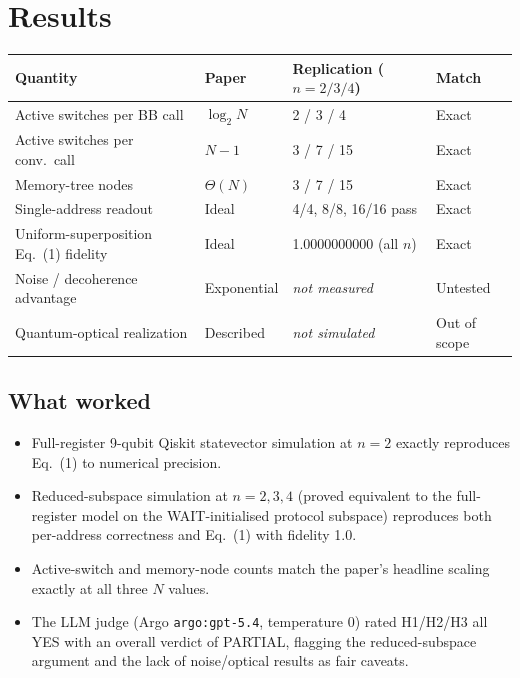 \documentclass[11pt]{article}
\begin{document}
\section{Results}
\begin{longtable}{@{}llll@{}}
\toprule
Quantity & Paper & Replication ($n{=}2/3/4$) & Match \\ \midrule
\endhead
Active switches per BB call & $\log_2 N$ & 2 / 3 / 4 & Exact \\
Active switches per conv.\ call & $N-1$ & 3 / 7 / 15 & Exact \\
Memory-tree nodes & $\Theta(N)$ & 3 / 7 / 15 & Exact \\
Single-address readout & Ideal & 4/4, 8/8, 16/16 pass & Exact \\
Uniform-superposition Eq.~(1) fidelity & Ideal & 1.0000000000 (all $n$) & Exact \\
Noise / decoherence advantage & Exponential & \textit{not measured} & Untested \\
Quantum-optical realization & Described & \textit{not simulated} & Out of scope \\
\bottomrule
\end{longtable}

\subsection{What worked}
\begin{itemize}
  \item Full-register 9-qubit Qiskit statevector simulation at $n{=}2$ exactly
    reproduces Eq.~(1) to numerical precision.
  \item Reduced-subspace simulation at $n{=}2,3,4$ (proved equivalent to the
    full-register model on the WAIT-initialised protocol subspace) reproduces
    both per-address correctness and Eq.~(1) with fidelity 1.0.
  \item Active-switch and memory-node counts match the paper's headline
    scaling exactly at all three $N$ values.
  \item The LLM judge (Argo \texttt{argo:gpt-5.4}, temperature 0) rated
    H1/H2/H3 all YES with an overall verdict of PARTIAL, flagging the
    reduced-subspace argument and the lack of noise/optical results as fair
    caveats.
\end{itemize}
\end{document}

